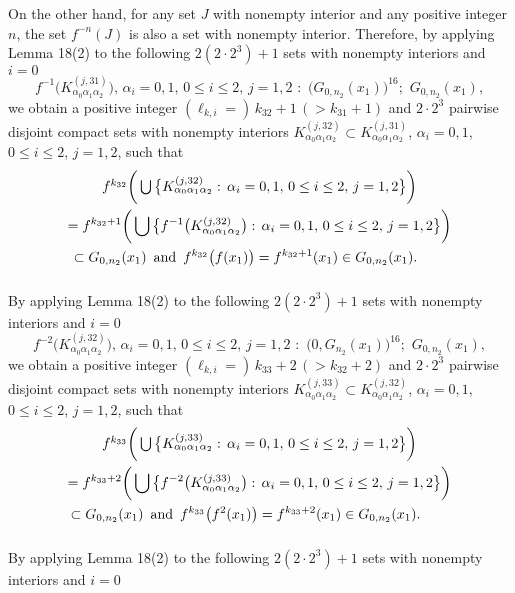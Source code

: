\documentclass[12pt]{article}
\newcommand{\al}{\alpha}
\begin{document}
\indent On the other hand, for any set $J$ with nonempty interior and any positive integer $n$, the set $f^{-n}(J)$ is also a set with nonempty interior.  Therefore, by applying Lemma 18(2) to the following $2(2 \cdot 2^3)+1$ sets with nonempty interiors and $i = 0$
$$
f^{-1}\big(K_{\al_0\al_1\al_2}^{(j,31)}\big), \, \al_i = 0, 1, \, 0 \le i \le 2, \, j = 1, 2 \,\, : \,\, \big(G_{0,n_2}(x_1)\big)^{16}; \,\, G_{0,n_2}(x_1),
$$
we obtain a positive integer $(\ell_{k,i} = ) \, k_{32}+1 \, (> k_{31}+1)$ and $2 \cdot 2^3$ pairwise disjoint compact sets with nonempty interiors $K_{\al_0\al_1\al_2}^{(j,32)} \subset K_{\al_0\al_1\al_2}^{(j,31)}$, $\al_i = 0, 1$, $0 \le i \le 2$, $j = 1, 2$, such that 
\begin{multline*}
$$
f^{k_{32}}\bigg(\bigcup \big\{ K_{\al_0\al_1\al_2}^{(j,32)}: \, \al_i = 0, 1, \, 0 \le i \le 2, \, j = 1, 2 \big\}\bigg) \\
= f^{k_{32}+1}\bigg(\bigcup \big\{f^{-1}\big(K_{\al_0\al_1\al_2}^{(j,32)}\big): \, \al_i = 0, 1, \, 0 \le i \le 2, \, j = 1, 2 \big\}\bigg) \\     \subset G_{0,n_2}(x_1) \,\,\, \text{and} \,\,\, f^{k_{32}}\big(f(x_1)\big) = f^{k_{32}+1}(x_1) \in G_{0,n_2}(x_1).\qquad\vspace{.15in}
$$
\end{multline*}
\indent By applying Lemma 18(2) to the following $2(2 \cdot 2^3)+1$ sets with nonempty interiors and $i = 0$
$$
f^{-2}\big(K_{\al_0\al_1\al_2}^{(j,32)}\big), \, \al_i = 0, 1, \, 0 \le i \le 2, \, j = 1, 2 \,\, : \,\, \big(0,G_{n_2}(x_1)\big)^{16}; \,\, G_{0,n_2}(x_1),
$$
we obtain a positive integer $(\ell_{k,i} = ) \, k_{33}+2 \, (> k_{32}+2)$ and $2 \cdot 2^3$ pairwise disjoint compact sets with nonempty interiors $K_{\al_0\al_1\al_2}^{(j,33)} \subset K_{\al_0\al_1\al_2}^{(j,32)}$, $\al_i = 0, 1$, $0 \le i \le 2$, $j = 1, 2$, such that 
\begin{multline*}
$$
f^{k_{33}}\bigg(\bigcup \big\{ K_{\al_0\al_1\al_2}^{(j,33)}: \, \al_i = 0, 1, \, 0 \le i \le 2, \, j = 1, 2 \big\}\bigg) \\
= f^{k_{33}+2}\bigg(\bigcup \big\{f^{-2}\big(K_{\al_0\al_1\al_2}^{(j,33)}\big): \, \al_i = 0, 1, \, 0 \le i \le 2, \, j = 1, 2 \big\}\bigg) \\     \subset G_{0,n_2}(x_1) \,\,\, \text{and} \,\,\, f^{k_{33}}\big(f^2(x_1)\big) = f^{k_{33}+2}(x_1) \in G_{0,n_2}(x_1).\qquad\vspace{.15in}
$$
\end{multline*}
\indent By applying Lemma 18(2) to the following $2(2 \cdot 2^3)+1$ sets with nonempty interiors and $i = 0$
\end{document}
